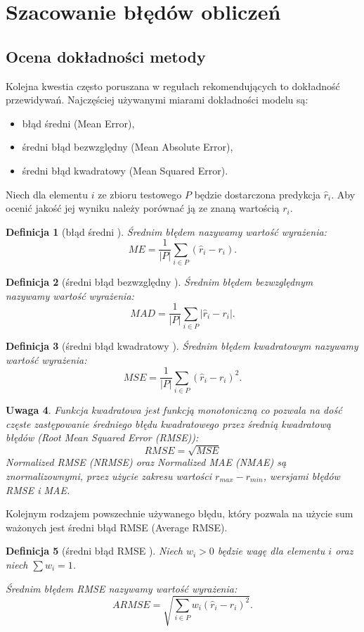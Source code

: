 \documentclass[12pt,a4paper]{report}
\newtheorem{df}{Definicja}[chapter]
\newtheorem{uwaga}[df]{Uwaga}
\begin{document}
\section{Szacowanie błędów obliczeń}
\subsection{Ocena dokładności metody}%
Kolejna kwestia często poruszana w regułach rekomendujących to dokładność przewidywań. Najczęściej używanymi miarami dokładności modelu są:
\begin{itemize}
\item błąd średni (Mean Error),
\item średni błąd bezwzględny (Mean Absolute Error),
\item średni błąd kwadratowy (Mean Squared Error).
\end{itemize}

Niech dla elementu $i$ ze zbioru testowego $P$ będzie dostarczona predykcja $\widehat{r}_i$. Aby ocenić jakość jej wyniku należy porównać ją ze znaną wartością $r_i$.

\begin{df}[błąd średni {\citep[Sec 4.1.1]{rsh}}]
Średnim błędem nazywamy wartość wyrażenia:
$$
ME = \frac{1}{|P|}\sum_{i\in P}(\widehat{r}_i-r_i).
$$
\end{df}

\begin{df}[średni błąd bezwzględny  {\citep[Sec 4.1.1]{rsh}}]
Średnim błędem bezwzględnym nazywamy wartość wyrażenia:
$$
MAD = \frac{1}{|P|}\sum_{i\in P}|\widehat{r}_i-r_i|.
$$
\end{df}

\begin{df}[średni błąd kwadratowy  {\citep[Sec 4.1.1]{rsh}}]
Średnim błędem kwadratowym nazywamy wartość wyrażenia:
$$
MSE = \frac{1}{|P|}\sum_{i\in P}(\widehat{r}_i-r_i)^2.
$$
\end{df}
\begin{uwaga}{\citep[Sec 4.1.1]{rsh}}
Funkcja kwadratowa jest funkcją monotoniczną co pozwala na dość częste zastępowanie średniego błędu kwadratowego przez średnią kwadratową błędów (Root Mean Squared Error (RMSE)):
$$
RMSE = \sqrt{MSE}
$$
Normalized RMSE (NRMSE) oraz Normalized MAE (NMAE) są znormalizownymi, przez użycie zakresu wartości $r_{max} - r_{min}$, wersjami błędów RMSE i MAE.
\end{uwaga}
Kolejnym rodzajem powszechnie używanego błędu, który pozwala na użycie sum ważonych jest średni błąd RMSE (Average RMSE).
\begin{df}[średni błąd RMSE {\citep[Sec 4.1.1]{rsh}}]
Niech $w_i>0$ będzie wagę dla elementu $i$ oraz niech $\sum w_i = 1$.

Średnim błędem RMSE nazywamy wartość wyrażenia:
$$
ARMSE = \sqrt{\sum_{i\in P}w_{i}(\widehat{r}_i-r_i)^2}.
$$
\end{df}
\end{document}
